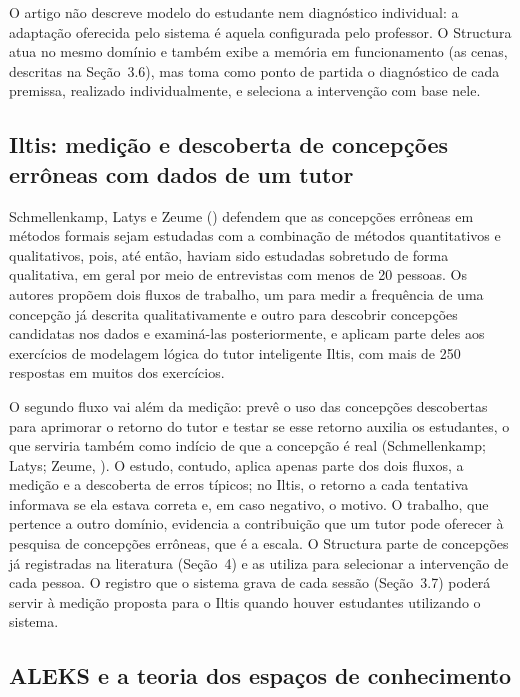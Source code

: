 O artigo não descreve modelo do estudante nem diagnóstico individual: a adaptação oferecida pelo sistema é aquela configurada pelo professor. O Structura atua no mesmo domínio e também exibe a memória em funcionamento (as cenas, descritas na Seção~3.6), mas toma como ponto de partida o diagnóstico de cada premissa, realizado individualmente, e seleciona a intervenção com base nele.

\subsection{Iltis: medição e descoberta de concepções errôneas com dados de um tutor}

Schmellenkamp, Latys e Zeume (\citeyear{schmellenkamp2023}) defendem que as concepções errôneas em métodos formais sejam estudadas com a combinação de métodos quantitativos e qualitativos, pois, até então, haviam sido estudadas sobretudo de forma qualitativa, em geral por meio de entrevistas com menos de 20 pessoas. Os autores propõem dois fluxos de trabalho, um para medir a frequência de uma concepção já descrita qualitativamente e outro para descobrir concepções candidatas nos dados e examiná-las posteriormente, e aplicam parte deles aos exercícios de modelagem lógica do tutor inteligente Iltis, com mais de 250 respostas em muitos dos exercícios.

O segundo fluxo vai além da medição: prevê o uso das concepções descobertas para aprimorar o retorno do tutor e testar se esse retorno auxilia os estudantes, o que serviria também como indício de que a concepção é real (Schmellenkamp; Latys; Zeume, \citeyear{schmellenkamp2023}). O estudo, contudo, aplica apenas parte dos dois fluxos, a medição e a descoberta de erros típicos; no Iltis, o retorno a cada tentativa informava se ela estava correta e, em caso negativo, o motivo. O trabalho, que pertence a outro domínio, evidencia a contribuição que um tutor pode oferecer à pesquisa de concepções errôneas, que é a escala. O Structura parte de concepções já registradas na literatura (Seção~4) e as utiliza para selecionar a intervenção de cada pessoa. O registro que o sistema grava de cada sessão (Seção~3.7) poderá servir à medição proposta para o Iltis quando houver estudantes utilizando o sistema.

\subsection{ALEKS e a teoria dos espaços de conhecimento}

